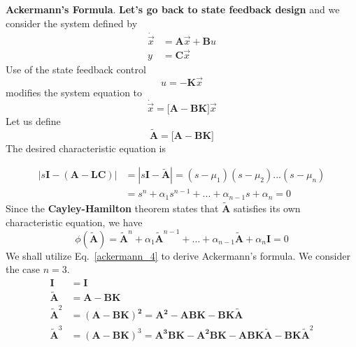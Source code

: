 \documentclass[11pt,a4paper,oneside]{book}
\numberwithin{equation}{section}
\theoremstyle{it}
\theoremstyle{definition}
\begin{document}
\vspace{5mm}
\textbf{Ackermann's Formula}.
\textbf{Let's go back to state feedback design} and we consider the system defined by
\begin{equation} \label{ackermann_1}
	\begin{split}
		\dot{\vec x} & = \mathbf{A}\vec x + \mathbf{B}u \\
		y & = \mathbf{C}\vec x
	\end{split}
\end{equation}
Use of the state feedback control 
\begin{equation*}
	u = -\mathbf{K}\vec x
\end{equation*}
modifies the system equation to 
\begin{equation} \label{ackermann_2}
	\dot{\vec x} = \mathbf{\Big[A-BK\Big]}\vec x
\end{equation}
Let us define
\begin{equation*}
	\tilde{\mathbf{A}} = \mathbf{\Big[A-BK\Big]}
\end{equation*}
The desired characteristic equation is

\begin{equation} \label{ackermann_3}
	\begin{split}
		|s\mathbf{I-(A - LC)}| & = |s\mathbf{I}-\tilde{\mathbf{A}}| = (s-\mu_1)(s-\mu_2)...(s-\mu_n) \\
		& = s^n +\alpha_1s^{n-1}+...+\alpha_{n-1}s+\alpha_n = 0
	\end{split}
\end{equation}
Since the \textbf{Cayley-Hamilton} theorem states that $\tilde{\mathbf{A}}$ satisfies its own characteristic equation, we have
\begin{equation} \label{ackermann_4}
	\phi(\tilde{\mathbf{A}}) = \tilde{\mathbf{A}}^n+\alpha_1\tilde{\mathbf{A}}^{n-1}+...+\alpha_{n-1}\tilde{\mathbf{A}}+\alpha_n\mathbf{I} = 0
\end{equation}
We shall utilize Eq.~\eqref{ackermann_4} to derive Ackermann's formula. We 
consider the case $n=3$.
\begin{equation*}
	\begin{split}
		\mathbf{I} & = \mathbf{I} \\
		\tilde{\mathbf{A}} & = \mathbf{A-BK} \\
		\tilde{\mathbf{A}}^2 & = \mathbf{(A-BK)^2=A^2-ABK-BK}\tilde{\mathbf{A}} \\
		\tilde{\mathbf{A}}^3 & = \mathbf{(A-BK)}^3=\mathbf{A^3BK-A^2BK-ABK}\tilde{\mathbf{A}}-\mathbf{BK}\tilde{\mathbf{A}}^2
	\end{split}
\end{equation*}
\end{document}
